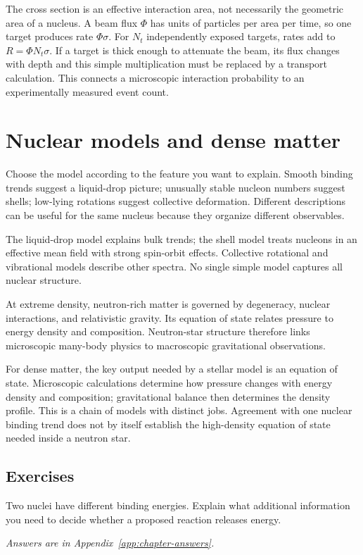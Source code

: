 \documentclass[11pt,oneside]{book}
\theoremstyle{reviewstyle}
\newcommand{\learningcheck}[1]{\subsection*{Exercises}\noindent #1\par\smallskip\noindent\emph{Answers are in Appendix~\ref{app:chapter-answers}.}}
\begin{document}
The cross section is an effective interaction area, not necessarily the geometric area of a nucleus. A beam flux $\Phi$ has units of particles per area per time, so one target produces rate $\Phi\sigma$. For $N_t$ independently exposed targets, rates add to $R=\Phi N_t\sigma$. If a target is thick enough to attenuate the beam, its flux changes with depth and this simple multiplication must be replaced by a transport calculation. This connects a microscopic interaction probability to an experimentally measured event count.

\section{Nuclear models and dense matter}
Choose the model according to the feature you want to explain. Smooth binding trends suggest a liquid-drop picture; unusually stable nucleon numbers suggest shells; low-lying rotations suggest collective deformation. Different descriptions can be useful for the same nucleus because they organize different observables.

The liquid-drop model explains bulk trends; the shell model treats nucleons in an effective mean field with strong spin-orbit effects. Collective rotational and vibrational models describe other spectra. No single simple model captures all nuclear structure.

At extreme density, neutron-rich matter is governed by degeneracy, nuclear interactions, and relativistic gravity. Its equation of state relates pressure to energy density and composition. Neutron-star structure therefore links microscopic many-body physics to macroscopic gravitational observations.

For dense matter, the key output needed by a stellar model is an equation of state. Microscopic calculations determine how pressure changes with energy density and composition; gravitational balance then determines the density profile. This is a chain of models with distinct jobs. Agreement with one nuclear binding trend does not by itself establish the high-density equation of state needed inside a neutron star.

\learningcheck{Two nuclei have different binding energies. Explain what additional information you need to decide whether a proposed reaction releases energy.}
\end{document}
